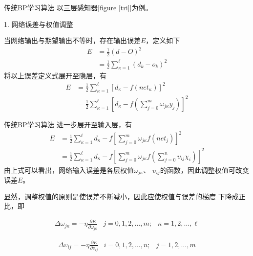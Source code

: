 \documentclass[xcolor=svgnames]{beamer}
\begin{document}
\begin{frame}{传统BP学习算法}
  以三层感知器[figure \alert{\ref{tri}}]为例。

  1. 网络误差与权值调整

  当网络输出与期望输出不等时，存在输出误差$E$，定义如下
  \begin{equation}
    \begin{array}{ll}
      E &=\frac{1}{2}(d-O)^2 \\
      &=\frac{1}{2}\sum_{\kappa=1}^\ell(d_k-o_k)^2
    \end{array}
  \end{equation}
  将以上误差定义式展开至隐层，有
  \begin{equation}
    \begin{array}{ll}
      E &=\frac{1}{2}\sum_{\kappa=1}^\ell[d_{\kappa}-f(net_\kappa)]^2 \\
      &=\frac{1}{2}\sum_{\kappa=1}^\ell[d_{\kappa}-f(\sum_{j=0}^m\omega_{j\kappa}y_j)]^2
    \end{array}
  \end{equation}
\end{frame}

\begin{frame}{传统BP学习算法}
  进一步展开至输入层，有
  \begin{equation}
    \begin{array}{ll}
      E &=\frac{1}{2}\sum_{\kappa=1}^\ell{d_{\kappa}-f[\sum_{j=0}^m\omega_{j\kappa}f(net_j)]}^2 \\
      &=\frac{1}{2}\sum_{\kappa=1}^\ell{d_{\kappa}-f[\sum_{j=0}^m\omega_{j\kappa}f(\sum_{j=0}^n\upsilon_{ij}\chi_i)]}^2
    \end{array}
  \end{equation}
  由上式可以看出，网络输入误差是各层权值$\omega_{j\kappa}$、%
  $\upsilon_{ij}$的函数，因此调整权值可改变误差$E$。

  显然，调整权值的原则是\alert{使误差不断减小}，因此应使权值与误差的梯度%
  下降成正比，即

  \begin{equation}
    \begin{array}{lll}
      \Delta \omega_{j\kappa}=-\eta \frac{\partial E}{\partial \omega_{j\kappa}} & j=0,1,2,\ldots,m; & \kappa=1,2,\ldots,\ell
    \end{array}
  \end{equation}

  \begin{equation}
    \begin{array}{lll}
      \Delta \upsilon_{ij}=-\eta \frac{\partial E}{\partial \upsilon_{ij}} & i=0,1,2,\ldots,n; & j=1,2,\ldots,m
    \end{array}
  \end{equation}

\end{frame}
\end{document}
